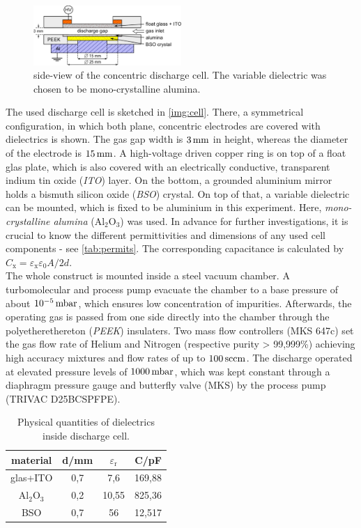 \documentclass[a4paper,10pt,twoside]{article}
\newcommand{\tenpo}[1]{ 10^{#1}}
\newcommand{\ix}[1]{_\text{#1}}
\newcommand{\tilt}[1]{\textit{#1}}
\begin{document}
				\begin{figure}
					\centering
					\includegraphics[width=0.5\textwidth]{figures/setup/discharge_cell.pdf}
					\caption{side-view of the concentric discharge cell. The variable dielectric was chosen to be mono-crystalline alumina.}
					\label{img:cell}
				\end{figure}
		
			The used discharge cell is sketched in \autoref{img:cell}. There, a symmetrical configuration, in which both plane, concentric electrodes are covered with dielectrics is shown. The gas gap width is $\unit[3]{mm}$ in height, whereas the diameter of the electrode is $\unit[15]{mm}$. A high-voltage driven copper ring is on top of a float glas plate, which is also covered with an electrically conductive, transparent indium tin oxide  (\tilt{ITO}) layer. On the bottom, a grounded aluminium mirror holds a bismuth silicon oxide (\tilt{BSO}) crystal. On top of that, a variable dielectric can be mounted, which is fixed to be aluminium in this experiment. Here, \tilt{mono-crystalline alumina} (Al$_2$O$_3$) was used. In advance for further investigations, it is crucial to know the different permittivities and dimensions of any used cell components - see \autoref{tab:permits}. The corresponding capacitance is calculated by $C\ix{x}=\varepsilon\ix{x}\varepsilon_0 A/2d$.\\
			The whole construct is mounted inside a steel vacuum chamber. A turbomolecular and process pump evacuate the chamber to a base pressure of about $\unit[\tenpo{-5}]{mbar}$, which ensures low concentration of impurities. Afterwards, the operating gas is passed from one side directly into the chamber through the polyetherethereton (\tilt{PEEK}) insulaters. Two mass flow controllers (MKS 647c) set the gas flow rate of Helium and Nitrogen (respective purity > 99,999\%) achieving high accuracy mixtures and flow rates of up to $\unit[100]{sccm}$. The discharge operated at elevated pressure levels of $\unit[1000]{mbar}$, which was kept constant through a diaphragm pressure gauge and butterfly valve (MKS) by the process pump (TRIVAC D25BCSPFPE).\\
			

				\begin{table}[h]
					\centering
					\begin{tabular}{c|c|c|c}
						material & d/mm & $\varepsilon\ix{r}$ & C/pF \\
						\hline glas+ITO & 0,7 & 7,6 & 169,88\\
						\hline Al$\ix{2}$O$\ix{3}$ & 0,2 & 10,55 & 825,36\\
						\hline BSO & 0,7 & 56 & 12,517 \\
					\end{tabular}
					\caption{Physical quantities of dielectrics inside discharge cell.}
					\label{tab:permits}
				\end{table}
\end{document}
